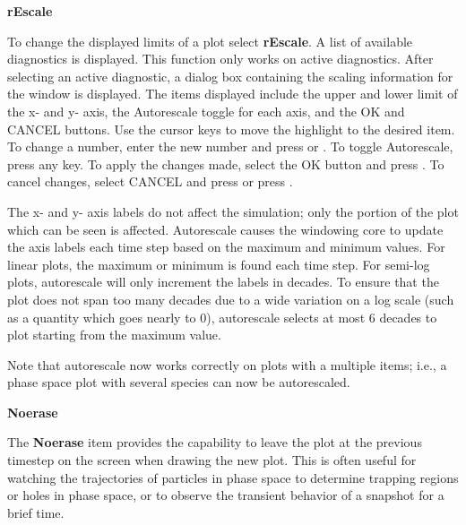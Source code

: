 \begin{section}
\begin{subsection}
\begin{subsubsection}
{\bf rEscale}

      To change the displayed limits of a plot select {\bf rEscale}.  A list of
      available diagnostics is displayed.  This function only works on active
      diagnostics.  After selecting an active diagnostic, a dialog box
      containing the scaling information for the window is displayed.  The
      items displayed include the upper and lower limit of the x- and y- axis,
      the Autorescale toggle for each axis, and the OK and CANCEL buttons.  Use
      the cursor keys to move the highlight to the desired item.  To change a
      number, enter the new number and press  or 
      \fbox{$\downarrow$}.  To
      toggle Autorescale, press any key.  To apply the changes made, select the
      OK button and press .  To cancel changes, select CANCEL and
      press  or press .
\vspace{.2in}

\noindent
      The x- and y- axis labels do not affect the simulation; only the portion
      of the plot which can be seen is affected.  Autorescale causes the
      windowing core to update the axis labels each time step based on the
      maximum and minimum values.  For linear plots, the maximum or minimum is
      found each time step.  For semi-log plots, autorescale will only
      increment the labels in decades.  To ensure that the plot does not span
      too many decades due to a wide variation on a log scale (such as a
      quantity which goes nearly to 0), autorescale selects at most 6 decades
      to plot starting from the maximum value.
\vspace{.2in}

\noindent
      Note that autorescale now works correctly on plots with a multiple items;
      i.e., a phase space plot with several species can now be autorescaled.
\end{subsubsection}

\begin{subsubsection}
{\bf Noerase}

      The {\bf Noerase} item provides the capability to leave the plot at the
      previous timestep on the screen when drawing the new plot.  This is often
      useful for watching the trajectories of particles in phase space to
      determine trapping regions or holes in phase space, or to observe the
      transient behavior of a snapshot for a brief time.
\vspace{.2in}


\end{subsubsection}
\end{subsection}
\end{section}
